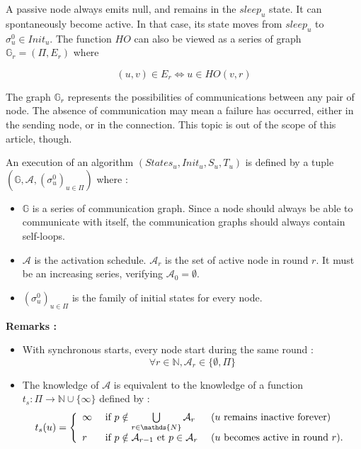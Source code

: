 \documentclass{article}
\newcommand{\ts}{t_{s}}
\begin{document}
A passive node always emits null, and remains in the $sleep_u$ state.
It can spontaneously become active. In that case, its state moves from $sleep_u$ to $\sigma^0_u \in Init_u$.
The function $HO$ can also be viewed as a series of graph $\mathds{G}_r = (\Pi, E_r)$ where

$$(u, v) \in E_r \Leftrightarrow u \in HO(v, r)$$

The graph $\mathds{G}_r$ represents the possibilities of communications between any pair of node.
The absence of communication may mean a failure has occurred, either in the sending node, or in the connection.
This topic is out of the scope of this article, though.

An execution of an algorithm $(States_u, Init_u, S_u, T_u)$ is defined by a tuple
$(\mathds{G}, \mathcal{A}, (\sigma^0_u)_{u \in \Pi})$ where :

\begin{itemize}
	\item $\mathds{G}$ is a series of communication graph. Since a node should always be able to communicate 
		with itself, the communication graphs should always contain self-loops.
	\item $\mathcal{A}$ is the activation schedule. $\mathcal{A}_r$ is the set of active node in round $r$.
		It must be an increasing series, verifying $\mathcal{A}_0 = \emptyset$.
	\item $(\sigma^0_u)_{u \in \Pi}$ is the family of initial states for every node.
\end{itemize}

\textbf{Remarks :}

\begin{itemize}
	\item With synchronous starts, every node start during the same round : 
		$$\forall r \in \mathds{N}, \mathcal{A}_r \in \{\emptyset, \Pi\}$$

	\item The knowledge of $\mathcal{A}$ is equivalent to the knowledge of a function
		$\ts : \Pi \rightarrow \mathds{N} \cup \{\infty\}$ defined by :
		$$\ts(u) = \left \{ \begin{array}{l ll}
		  \infty & \mbox{ if  } p \notin \bigcup\limits_{r \in \mathds{N}}  \mathcal{A}_r & 
			  \mbox { ($u$ remains inactive forever) } \\
		  r  & \mbox{ if  } p \notin \mathcal{A}_{r-1} \mbox{ et } p \in \mathcal{A}_{r}  &
			  \mbox{ ($u$ becomes active in round $r$)}.
		  \end{array} \right.$$

\end{itemize}
\end{document}
